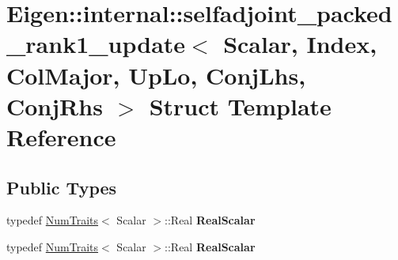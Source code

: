\hypertarget{struct_eigen_1_1internal_1_1selfadjoint__packed__rank1__update_3_01_scalar_00_01_index_00_01_col211b56a6e7dbb087a746c109f1fd6193}{}\section{Eigen\+:\+:internal\+:\+:selfadjoint\+\_\+packed\+\_\+rank1\+\_\+update$<$ Scalar, Index, Col\+Major, Up\+Lo, Conj\+Lhs, Conj\+Rhs $>$ Struct Template Reference}
\label{struct_eigen_1_1internal_1_1selfadjoint__packed__rank1__update_3_01_scalar_00_01_index_00_01_col211b56a6e7dbb087a746c109f1fd6193}
\subsection*{Public Types}
\begin{DoxyCompactItemize}
\item 
\mbox{\label{struct_eigen_1_1internal_1_1selfadjoint__packed__rank1__update_3_01_scalar_00_01_index_00_01_col211b56a6e7dbb087a746c109f1fd6193_a6584b87654eac82f1d1e26e96b63cbd5}} 
typedef \hyperlink{group___core___module_struct_eigen_1_1_num_traits}{Num\+Traits}$<$ Scalar $>$\+::Real {\bfseries Real\+Scalar}
\item 
\mbox{\label{struct_eigen_1_1internal_1_1selfadjoint__packed__rank1__update_3_01_scalar_00_01_index_00_01_col211b56a6e7dbb087a746c109f1fd6193_a6584b87654eac82f1d1e26e96b63cbd5}} 
typedef \hyperlink{group___core___module_struct_eigen_1_1_num_traits}{Num\+Traits}$<$ Scalar $>$\+::Real {\bfseries Real\+Scalar}
\end{DoxyCompactItemize}
